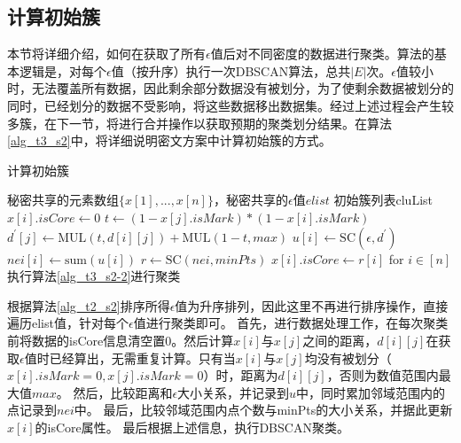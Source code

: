 \subsection{计算初始簇}
本节将详细介绍，如何在获取了所有$\epsilon$值后对不同密度的数据进行聚类。算法的基本逻辑是，对每个$\epsilon$值（按升序）执行一次DBSCAN算法，总共$|E|$次。$\epsilon$值较小时，无法覆盖所有数据，因此剩余部分数据没有被划分，为了使剩余数据被划分的同时，已经划分的数据不受影响，将这些数据移出数据集。经过上述过程会产生较多簇，在下一节，将进行合并操作以获取预期的聚类划分结果。在算法\ref{alg_t3_s2}中，将详细说明密文方案中计算初始簇的方式。

\begin{algorithm}[htbp]
	\renewcommand{\algorithmicrequire}{\textbf{输入:}}
	\renewcommand{\algorithmicensure}{\textbf{输出:}}
	\caption{计算初始簇}
	\label{alg_t3_s2} %
	\begin{algorithmic}[1]
		\REQUIRE 秘密共享的元素数组$ \{x[1],...,x[n]\} $，秘密共享的$\epsilon$值$ elist $
		\ENSURE 初始簇列表cluList
		\STATE $x[i].isCore \leftarrow 0$ %
		\STATE $t \leftarrow ( 1- x[j].isMark) * (1-x[i].isMark)$
		\STATE $d^{\prime}[j] \leftarrow \text{MUL}(t,d[i][j])+\text{MUL}(1-t,max)$
		\ENDFOR
		\STATE $u[i] \leftarrow \text{SC}(\epsilon, d^{\prime})$
		\STATE $nei[i] \leftarrow \text{sum}(u[i])$
		\ENDFOR
		\STATE $r \leftarrow \text{SC}(nei, minPts)$
		\STATE $x[i].isCore \leftarrow r[i]$ for $i\in[n]$
		\STATE 执行算法\ref{alg_t3_s2-2}进行聚类
		\ENDFOR
	\end{algorithmic}
\end{algorithm}

根据算法\ref{alg_t2_s2}排序所得$\epsilon$值为升序排列，因此这里不再进行排序操作，直接遍历elist值，针对每个$\epsilon$值进行聚类即可。
首先，进行数据处理工作，在每次聚类前将数据的isCore信息清空置0。然后计算$x[i]$与$x[j]$之间的距离，$d[i][j]$在获取$\epsilon$值时已经算出，无需重复计算。只有当$x[i]$与$x[j]$均没有被划分（$x[i].isMark=0,x[j].isMark=0$）时，距离为$d[i][j]$，否则为数值范围内最大值$max$。
然后，比较距离和$\epsilon$大小关系，并记录到$u$中，同时累加邻域范围内的点记录到$nei$中。
最后，比较邻域范围内点个数与minPts的大小关系，并据此更新$x[i]$的isCore属性。
最后根据上述信息，执行DBSCAN聚类。

